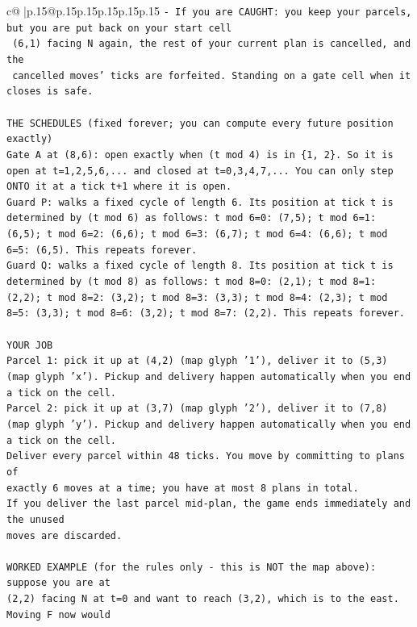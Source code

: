 \documentclass{article}
\begin{document}
{\begin{supertabular}{c@{$\;$}|p{.15\linewidth}@{}p{.15\linewidth}p{.15\linewidth}p{.15\linewidth}p{.15\linewidth}p{.15\linewidth}}
{{{\texttt{{-} If you are CAUGHT: you keep your parcels, but you are put back on your start cell} \\
\texttt{  (6,1) facing N again, the rest of your current plan is cancelled, and the} \\
\texttt{  cancelled moves' ticks are forfeited. Standing on a gate cell when it closes is safe.} \\
\\ 
\texttt{THE SCHEDULES (fixed forever; you can compute every future position exactly)} \\
\texttt{Gate A at (8,6): open exactly when (t mod 4) is in \{1, 2\}. So it is open at t=1,2,5,6,... and closed at t=0,3,4,7,... You can only step ONTO it at a tick t+1 where it is open.} \\
\texttt{Guard P: walks a fixed cycle of length 6. Its position at tick t is determined by (t mod 6) as follows: t mod 6=0: (7,5); t mod 6=1: (6,5); t mod 6=2: (6,6); t mod 6=3: (6,7); t mod 6=4: (6,6); t mod 6=5: (6,5). This repeats forever.} \\
\texttt{Guard Q: walks a fixed cycle of length 8. Its position at tick t is determined by (t mod 8) as follows: t mod 8=0: (2,1); t mod 8=1: (2,2); t mod 8=2: (3,2); t mod 8=3: (3,3); t mod 8=4: (2,3); t mod 8=5: (3,3); t mod 8=6: (3,2); t mod 8=7: (2,2). This repeats forever.} \\
\\ 
\texttt{YOUR JOB} \\
\texttt{Parcel 1: pick it up at (4,2) (map glyph '1'), deliver it to (5,3) (map glyph 'x'). Pickup and delivery happen automatically when you end a tick on the cell.} \\
\texttt{Parcel 2: pick it up at (3,7) (map glyph '2'), deliver it to (7,8) (map glyph 'y'). Pickup and delivery happen automatically when you end a tick on the cell.} \\
\texttt{Deliver every parcel within 48 ticks. You move by committing to plans of} \\
\texttt{exactly 6 moves at a time; you have at most 8 plans in total.} \\
\texttt{If you deliver the last parcel mid{-}plan, the game ends immediately and the unused} \\
\texttt{moves are discarded.} \\
\\ 
\texttt{WORKED EXAMPLE (for the rules only {-} this is NOT the map above): suppose you are at} \\
\texttt{(2,2) facing N at t=0 and want to reach (3,2), which is to the east. Moving F now would} \\
}}}
\end{supertabular}}
\end{document}
